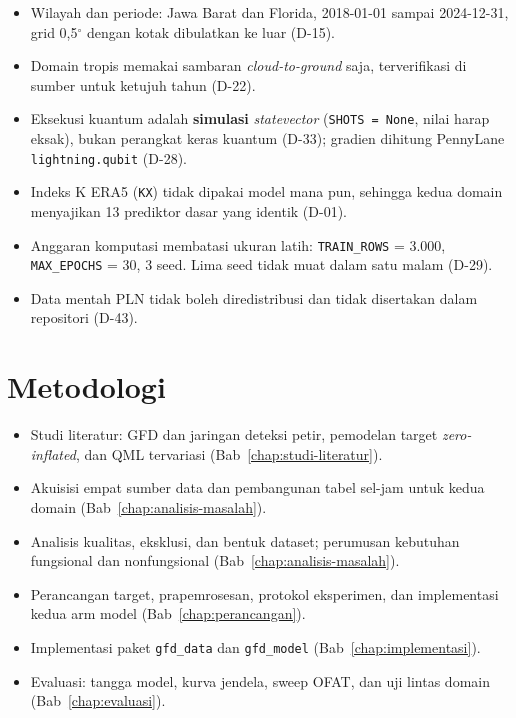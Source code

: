 \begin{itemize}
    \item Wilayah dan periode: Jawa Barat dan Florida, 2018-01-01 sampai
          2024-12-31, grid 0,5$^\circ$ dengan kotak dibulatkan ke luar
          (D-15).
    \item Domain tropis memakai sambaran \textit{cloud-to-ground} saja,
          terverifikasi di sumber untuk ketujuh tahun (D-22).
    \item Eksekusi kuantum adalah \textbf{simulasi} \textit{statevector}
          (\texttt{SHOTS = None}, nilai harap eksak), bukan perangkat keras
          kuantum (D-33); gradien dihitung PennyLane \texttt{lightning.qubit}
          (D-28).
    \item Indeks K ERA5 (\texttt{KX}) tidak dipakai model mana pun, sehingga
          kedua domain menyajikan 13 prediktor dasar yang identik (D-01).
    \item Anggaran komputasi membatasi ukuran latih: \texttt{TRAIN\_ROWS}
          = 3.000, \texttt{MAX\_EPOCHS} = 30, 3 seed. Lima seed tidak muat
          dalam satu malam (D-29).
    \item Data mentah PLN tidak boleh diredistribusi dan tidak disertakan dalam
          repositori (D-43).
\end{itemize}

\section{Metodologi}

\begin{itemize}
    \item Studi literatur: GFD dan jaringan deteksi petir, pemodelan target
          \textit{zero-inflated}, dan QML tervariasi (Bab~\ref{chap:studi-literatur}).
    \item Akuisisi empat sumber data dan pembangunan tabel sel-jam untuk kedua
          domain (Bab~\ref{chap:analisis-masalah}).
    \item Analisis kualitas, eksklusi, dan bentuk dataset; perumusan kebutuhan
          fungsional dan nonfungsional (Bab~\ref{chap:analisis-masalah}).
    \item Perancangan target, prapemrosesan, protokol eksperimen, dan
          implementasi kedua arm model (Bab~\ref{chap:perancangan}).
    \item Implementasi paket \texttt{gfd\_data} dan \texttt{gfd\_model}
          (Bab~\ref{chap:implementasi}).
    \item Evaluasi: tangga model, kurva jendela, sweep OFAT, dan uji lintas
          domain (Bab~\ref{chap:evaluasi}).
\end{itemize}

